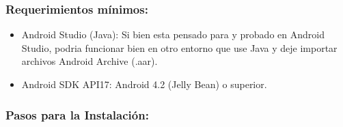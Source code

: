 \subsubsection{Requerimientos mínimos:}

\begin{itemize}
\item Android Studio (Java): Si bien esta pensado para y probado en Android Studio, podria funcionar bien en otro entorno que use Java y deje importar archivos Android Archive (.aar).
\item Android SDK API17: Android 4.2 (Jelly Bean) o superior.
\end{itemize}

\subsubsection{Pasos para la Instalación:}

